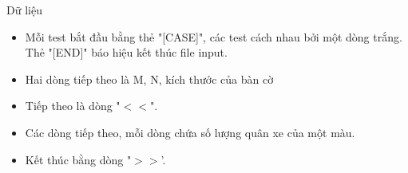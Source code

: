 Dữ liệu  
\begin{itemize}
	\item     Mỗi test bắt đầu bằng thẻ "[CASE]", các test cách nhau bởi một dòng trắng. Thẻ "[END]" báo hiệu kết thúc file input.   
	\item     Hai dòng tiếp theo là M, N, kích thước của bàn cờ   
	\item     Tiếp theo là dòng "$<$$<$".   
	\item     Các dòng tiếp theo, mỗi dòng chứa số lượng quân xe của một màu.   
	\item     Kết thúc bằng dòng "$>$$>$'.   
\end{itemize}